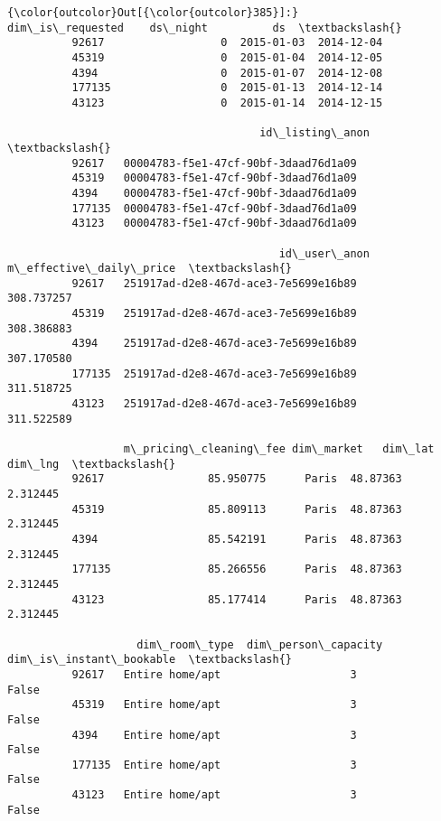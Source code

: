 \documentclass[11pt]{article}
\begin{document}
\begin{Verbatim}[commandchars=\\\{\}]
{\color{outcolor}Out[{\color{outcolor}385}]:}         dim\_is\_requested    ds\_night          ds  \textbackslash{}
          92617                  0  2015-01-03  2014-12-04   
          45319                  0  2015-01-04  2014-12-05   
          4394                   0  2015-01-07  2014-12-08   
          177135                 0  2015-01-13  2014-12-14   
          43123                  0  2015-01-14  2014-12-15   
          
                                       id\_listing\_anon  \textbackslash{}
          92617   00004783-f5e1-47cf-90bf-3daad76d1a09   
          45319   00004783-f5e1-47cf-90bf-3daad76d1a09   
          4394    00004783-f5e1-47cf-90bf-3daad76d1a09   
          177135  00004783-f5e1-47cf-90bf-3daad76d1a09   
          43123   00004783-f5e1-47cf-90bf-3daad76d1a09   
          
                                          id\_user\_anon  m\_effective\_daily\_price  \textbackslash{}
          92617   251917ad-d2e8-467d-ace3-7e5699e16b89               308.737257   
          45319   251917ad-d2e8-467d-ace3-7e5699e16b89               308.386883   
          4394    251917ad-d2e8-467d-ace3-7e5699e16b89               307.170580   
          177135  251917ad-d2e8-467d-ace3-7e5699e16b89               311.518725   
          43123   251917ad-d2e8-467d-ace3-7e5699e16b89               311.522589   
          
                  m\_pricing\_cleaning\_fee dim\_market   dim\_lat   dim\_lng  \textbackslash{}
          92617                85.950775      Paris  48.87363  2.312445   
          45319                85.809113      Paris  48.87363  2.312445   
          4394                 85.542191      Paris  48.87363  2.312445   
          177135               85.266556      Paris  48.87363  2.312445   
          43123                85.177414      Paris  48.87363  2.312445   
          
                    dim\_room\_type  dim\_person\_capacity  dim\_is\_instant\_bookable  \textbackslash{}
          92617   Entire home/apt                    3                    False   
          45319   Entire home/apt                    3                    False   
          4394    Entire home/apt                    3                    False   
          177135  Entire home/apt                    3                    False   
          43123   Entire home/apt                    3                    False   
          

\end{Verbatim}
\end{document}
